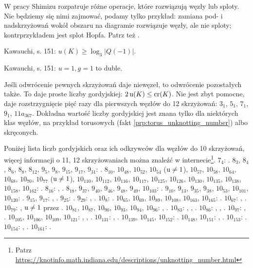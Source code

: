 W pracy \cite{shimizu14} Shimizu rozpatruje różne operacje, które rozwiązują węzły lub sploty.
Nie będziemy się nimi zajmować, podamy tylko przykład: zamiana pod- i nadskrzyżowań wokół obszaru na diagramie rozwiązuje węzły, ale nie sploty; kontrprzykładem jest splot Hopfa.
%
Patrz też \cite[s. 141-154]{kawauchi96}.

\begin{tobedone}
    Kawauchi, s. 151: $u(K) \ge \log_3|Q(-1)|$.
\end{tobedone}

\begin{tobedone}
    Kawauchi, s. 151: $u = 1, g = 1$ to duble.
\end{tobedone}

Jeśli odwrócenie pewnych skrzyżowań daje niewęzeł, to odwrócenie pozostałych także.
To daje proste liczby gordyjskiej: $2 \operatorname{u} (K) \le \operatorname{cr} (K)$.
Nie jest zbyt pomocne, daje rozstrzygnięcie pięć razy dla pierwszych węzłów do 12 skrzyżowań: $3_{1}$, $5_{1}$, $7_{1}$, $9_{1}$, $11a_{367}$.
Dokładna wartość liczby gordyjskiej jest znana tylko dla niektórych klas węzłów, na przykład torusowych (fakt \ref{prp:torus_unknotting_number}) albo skręconych.

Poniżej lista liczb gordyjskich oraz ich odkrywców dla węzłów do 10 skrzyżowań, więcej informacji o 11, 12 skrzyżowaniach można znaleźć w internecie\footnote{Patrz \url{https://knotinfo.math.indiana.edu/descriptions/unknotting_number.html}}.
$7_{4}$: \cite{lickorish85}.
$8_{3}$, $8_{4}$, $8_{6}$, $8_{8}$, $8_{12}$, $9_{5}$, $9_{8}$, $9_{15}$, $9_{17}$, $9_{31}$: \cite{kanenobumurakami86}.
$8_{10}$, $10_{48}$, $10_{52}$, $10_{54}$ ($\operatorname{u} \neq 1$), $10_{57}$, $10_{58}$, $10_{64}$, $10_{68}$, $10_{70}$, $10_{77}$ ($\operatorname{u} \neq 1$), $10_{110}$, $10_{112}$, $10_{116}$, $10_{117}$, $10_{125}$, $10_{126}$, $10_{130}$, $10_{135}$, $10_{138}$, $10_{158}$, $10_{162}$: \cite{szabo05}.
$8_{16}$: \cite{yasuhara00}, \cite{stoimenow04}.
$8_{18}$, $9_{37}$, $9_{40}$, $9_{46}$, $9_{48}$, $9_{49}$, $10_{103}$: \cite{stoimenow04}.
$9_{10}$, $9_{13}$, $9_{35}$, $9_{38}$, $10_{53}$, $10_{101}$, $10_{120}$: \cite{owens08}.
$9_{15}$, $9_{17}$: \cite{kanenobumurakami86}, \cite{stoimenow04}.
$9_{25}$: \cite{kobayashi89}.
$9_{29}$: \cite{gordon06}, \cite{szabo05}.
$10_{8}$: \cite[s. 62]{adams94}.
$10_{65}$, $10_{69}$, $10_{89}$, $10_{108}$, $10_{163}$, $10_{165}$: \cite{miyazawa98}.
$10_{67}$: \cite{traczyk99}, \cite{szabo05}.
$10_{79}$: \cite{szabo05}, $\operatorname{u} \neq 1$ przez \cite{gordon06}.
$10_{81}$, $10_{87}$, $10_{90}$, $10_{93}$, $10_{94}$, $10_{96}$: \cite{gordon06}, \cite{szabo05}.
$10_{83}$: \cite{gordon06}, \cite{szabo05}, \cite{nakanishi05}.
$10_{86}$: \cite{stoimenow04}, \cite{szabo05}, \cite{gordon06}.
$10_{97}$: \cite{miyazawa98}, \cite{nakanishi05}.
$10_{105}$, $10_{106}$, $10_{109}$, $10_{121}$: \cite{szabo05}, \cite{stoimenow04}, \cite{nakanishi05}.
$10_{131}$: \cite{stoimenow04}, \cite{szabo05}.
$10_{139}$, $10_{145}$, $10_{152}$: \cite{ishikawa02}.
$10_{148}$, $10_{151}$: \cite{gordon06}, \cite{szabo05}.
$10_{153}$: \cite{gordon06}.
$10_{154}$: \cite{stoimenow03}, \cite{ishikawa02}.
$10_{161}$: \cite{ishikawa02}.


